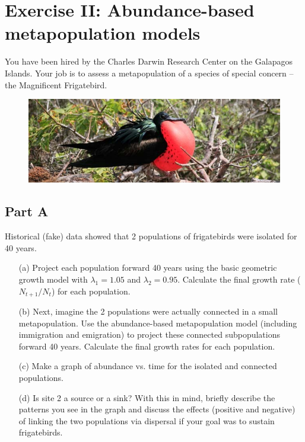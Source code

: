 \documentclass[12pt]{article}\usepackage[]{graphicx}\usepackage[]{color}
\begin{document}
\clearpage


\section*{Exercise II: Abundance-based metapopulation models }
You have been hired by the Charles Darwin Research Center on the
Galapagos Islands. Your job is to assess a metapopulation of a species
of special concern -- the Magnificent Frigatebird.

\begin{figure}[h!]
  \centering
  \includegraphics[width=\textwidth]{figs/frigatebird}
  \label{fig:frig}
\end{figure}

\vspace{-24pt}

\subsection*{Part A}
\vspace{-12pt}
Historical (fake) data showed that 2 populations of frigatebirds were
isolated for 40 years.

\begin{enumerate}
  \item[(a)] Project each population forward 40 years using the basic
    geometric growth model with $\lambda_1=1.05$ and
    $\lambda_2=0.95$. Calculate the final growth rate ($N_{t+1}/N_t$)
    for each population.
  \item[(b)] Next, imagine the 2 populations were actually connected
    in a small metapopulation. Use the abundance-based metapopulation
    model (including immigration and emigration) to project these
    connected subpopulations forward 40 years. Calculate the final
    growth rates for each population.
  \item[(c)] Make a graph of abundance vs. time for the isolated and
    connected populations.
  \item[(d)] Is site 2 a source or a sink? With this in mind,
    briefly describe the patterns you see in the graph and discuss the
    effects (positive and negative) of linking the two populations via
    dispersal if your goal was to sustain frigatebirds.
\end{enumerate}
\end{document}
